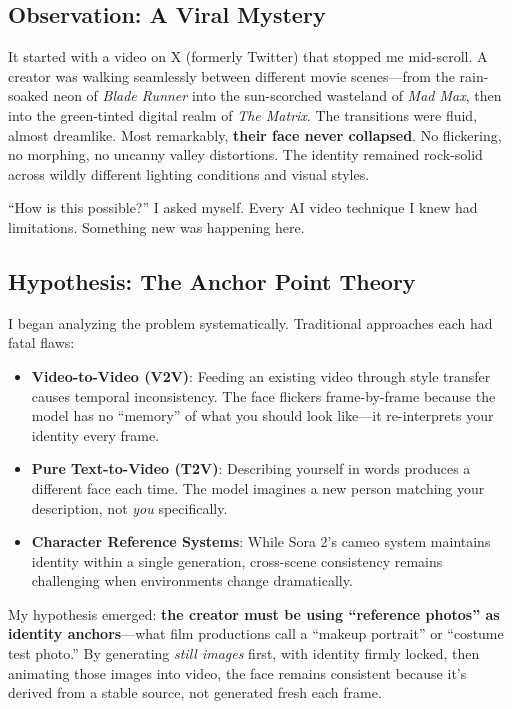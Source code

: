 \subsection{Observation: A Viral Mystery}

It started with a video on X (formerly Twitter) that stopped me mid-scroll. A creator was walking seamlessly between different movie scenes—from the rain-soaked neon of \textit{Blade Runner} into the sun-scorched wasteland of \textit{Mad Max}, then into the green-tinted digital realm of \textit{The Matrix}. The transitions were fluid, almost dreamlike. Most remarkably, \textbf{their face never collapsed}. No flickering, no morphing, no uncanny valley distortions. The identity remained rock-solid across wildly different lighting conditions and visual styles.

``How is this possible?'' I asked myself. Every AI video technique I knew had limitations. Something new was happening here.

\subsection{Hypothesis: The Anchor Point Theory}

I began analyzing the problem systematically. Traditional approaches each had fatal flaws:

\begin{itemize}
\item \textbf{Video-to-Video (V2V)}: Feeding an existing video through style transfer causes temporal inconsistency. The face flickers frame-by-frame because the model has no ``memory'' of what you should look like—it re-interprets your identity every frame.

\item \textbf{Pure Text-to-Video (T2V)}: Describing yourself in words produces a different face each time. The model imagines a new person matching your description, not \textit{you} specifically.

\item \textbf{Character Reference Systems}: While Sora 2's cameo system maintains identity within a single generation, cross-scene consistency remains challenging when environments change dramatically.
\end{itemize}

My hypothesis emerged: \textbf{the creator must be using ``reference photos'' as identity anchors}—what film productions call a ``makeup portrait'' or ``costume test photo.'' By generating \textit{still images} first, with identity firmly locked, then animating those images into video, the face remains consistent because it's derived from a stable source, not generated fresh each frame.

